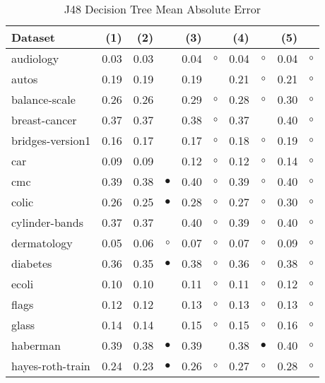 \begin{table}[thb]
\caption{\label{j48mae}J48 Decision Tree Mean Absolute Error}
\footnotesize
{\centering \begin{tabular}{lrr@{\hspace{0.1cm}}cr@{\hspace{0.1cm}}cr@{\hspace{0.1cm}}cr@{\hspace{0.1cm}}c}
\\
\hline
Dataset & (1)& (2) & & (3) & & (4) & & (5) & \\
\hline
audiology & 0.03 & 0.03 &           & 0.04 &   $\circ$ & 0.04 &   $\circ$ & 0.04 &  $\circ$\\
autos & 0.19 & 0.19 &           & 0.19 &           & 0.21 &   $\circ$ & 0.21 &  $\circ$\\
balance-scale & 0.26 & 0.26 &           & 0.29 &   $\circ$ & 0.28 &   $\circ$ & 0.30 &  $\circ$\\
breast-cancer & 0.37 & 0.37 &           & 0.38 &   $\circ$ & 0.37 &           & 0.40 &  $\circ$\\
bridges-version1 & 0.16 & 0.17 &           & 0.17 &   $\circ$ & 0.18 &   $\circ$ & 0.19 &  $\circ$\\
car & 0.09 & 0.09 &           & 0.12 &   $\circ$ & 0.12 &   $\circ$ & 0.14 &  $\circ$\\
cmc & 0.39 & 0.38 & $\bullet$ & 0.40 &   $\circ$ & 0.39 &   $\circ$ & 0.40 &  $\circ$\\
colic & 0.26 & 0.25 & $\bullet$ & 0.28 &   $\circ$ & 0.27 &   $\circ$ & 0.30 &  $\circ$\\
cylinder-bands & 0.37 & 0.37 &           & 0.40 &   $\circ$ & 0.39 &   $\circ$ & 0.40 &  $\circ$\\
dermatology & 0.05 & 0.06 &   $\circ$ & 0.07 &   $\circ$ & 0.07 &   $\circ$ & 0.09 &  $\circ$\\
diabetes & 0.36 & 0.35 & $\bullet$ & 0.38 &   $\circ$ & 0.36 &   $\circ$ & 0.38 &  $\circ$\\
ecoli & 0.10 & 0.10 &           & 0.11 &   $\circ$ & 0.11 &   $\circ$ & 0.12 &  $\circ$\\
flags & 0.12 & 0.12 &           & 0.13 &   $\circ$ & 0.13 &   $\circ$ & 0.13 &  $\circ$\\
glass & 0.14 & 0.14 &           & 0.15 &   $\circ$ & 0.15 &   $\circ$ & 0.16 &  $\circ$\\
haberman & 0.39 & 0.38 & $\bullet$ & 0.39 &           & 0.38 & $\bullet$ & 0.40 &  $\circ$\\
hayes-roth-train & 0.24 & 0.23 & $\bullet$ & 0.26 &   $\circ$ & 0.27 &   $\circ$ & 0.28 &  $\circ$\\

\end{tabular}}
\end{table}
